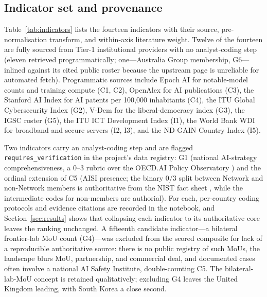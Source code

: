 \documentclass[11pt]{article}
\begin{document}
\subsection{Indicator set and provenance}
Table~\ref{tab:indicators} lists the fourteen indicators with their source, pre-normalisation transform, and within-axis literature weight. Twelve of the fourteen are fully sourced from Tier-1 institutional providers with no analyst-coding step (eleven retrieved programmatically; one---Australia Group membership, G6---inlined against its cited public roster \citep{australiagroup2024} because the upstream page is unreliable for automated fetch). Programmatic sources include Epoch AI \citep{epoch2024models} for notable-model counts and training compute (C1, C2), OpenAlex \citep{priem2022openalex} for AI publications (C3), the Stanford AI Index \citep{maslej2025aiindex} for AI patents per 100{,}000 inhabitants (C4), the ITU Global Cybersecurity Index \citep{itu2024gci} (G2), V-Dem \citep{vdem2026v16} for the liberal-democracy index (G3), the IGSC roster \citep{igsc2026} (G5), the ITU ICT Development Index \citep{itu2024idi} (I1), the World Bank WDI \citep{worldbank2024wdi} for broadband and secure servers (I2, I3), and the ND-GAIN Country Index \citep{ndgain2026} (I5).

Two indicators carry an analyst-coding step and are flagged \texttt{requires\_verification} in the project's data registry: G1 (national AI-strategy comprehensiveness, a 0--3 rubric over the OECD.AI Policy Observatory \citep{oecdai2024}) and the ordinal extension of C5 (AISI presence; the binary 0/3 split between Network and non-Network members is authoritative from the NIST fact sheet \citep{nist2024aisi}, while the intermediate codes for non-members are authorial). For each, per-country coding protocols and evidence citations are recorded in the notebook, and Section~\ref{sec:results} shows that collapsing each indicator to its authoritative core leaves the ranking unchanged. A fifteenth candidate indicator---a bilateral frontier-lab MoU count (G4)---was excluded from the scored composite for lack of a reproducible authoritative source: there is no public registry of such MoUs, the landscape blurs MoU, partnership, and commercial deal, and documented cases often involve a national AI Safety Institute, double-counting C5. The bilateral-lab-MoU concept is retained qualitatively; excluding G4 leaves the United Kingdom leading, with South Korea a close second.
\end{document}

